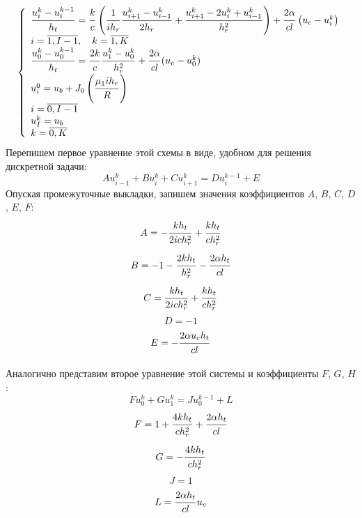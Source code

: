 \documentclass[a4paper,12pt,russian, fleqn]{extreport}
\begin{document}
	\begin{equation}\label{ImplicitScheme}
		\left\{\begin{array}{l}
			\dfrac{\strut u_i^{k}-u_i^{k-1}}{\strut h_t} = \dfrac{\strut k}{\strut c}\left(\dfrac{\strut 1}{\strut ih_r}\dfrac{\strut u_{i+1}^k - u_{i-1}^k}{\strut 2h_r} +\dfrac{\strut u_{i+1}^k - 2u_i^k + u_{i-1}^k}{\strut h^2_r}\right) + \dfrac{\strut 2\alpha}{\strut cl}\left (u_c - u_i^k \right) \\
			i = \overline{1,I-1}, \quad k = \overline{1,K}	 \\
			\dfrac{\strut u_0^{k}-u_0^{k-1}}{\strut h_t} = \dfrac{\strut 2k}{\strut c}\dfrac{\strut u_1^k-u_0^k}{\strut h_r^2} + \dfrac{\strut 2\alpha}{\strut cl}(u_c-u_0^k) \\
			u_i^0 = u_b + J_0\left( \dfrac{\strut \mu_1 ih_r}{\strut R} \right) \\
			i = \overline{0, I-1} \\
			u_I^k = u_b \\
			k = \overline{0,K}
		\end{array}\right.
	\end{equation}
	Перепишем первое уравнение этой схемы в виде, удобном для решения дискретной задачи:
	\begin{equation}\label{TridiagonalEquationOne}
		Au^k_{i-1} + Bu^k_i + Cu^k_{i+1} = Du_i^{k-1} + E
	\end{equation}
	Опуская промежуточные выкладки, запишем значения коэффициентов $A$, $B$, $C$, $D$, $E$, $F$:
	\begin{equation*}
		A = -\dfrac{\strut k h_t}{\strut 2ich_r^2} + \dfrac{\strut k h_t}{\strut c h_r^2}
	\end{equation*}
	\begin{equation*}
		B = - 1 - \dfrac{\strut 2 k h_t}{\strut h_r^2} - \dfrac{\strut 2 \alpha h_t}{\strut cl}
	\end{equation*}
	\begin{equation*}
		C = \dfrac{\strut k h_t}{\strut 2ich_r^2} + \dfrac{\strut k h_t}{\strut c h_r^2}
	\end{equation*}
	\begin{equation*}
		D = -1
	\end{equation*}
	\begin{equation*}
		E = - \dfrac{\strut 2\alpha u_c h_t}{\strut cl}
	\end{equation*}
	
	Аналогично представим второе уравнение этой системы и коэффициенты $F$, $G$, $H$:
	\begin{equation}\label{TridiagonalEquationTwo}
		Fu_0^k + Gu_1^{k} = Ju_0^{k-1} + L
	\end{equation}
	\begin{equation*}
		F = 1 + \dfrac{\strut 4kh_t}{\strut ch_r^2} + \dfrac{\strut 2\alpha h_t}{\strut cl}
	\end{equation*}
	\begin{equation*}
		G = -\dfrac{\strut 4kh_t}{\strut ch_r^2}
	\end{equation*}
	\begin{equation*}
		J = 1
	\end{equation*}
	\begin{equation*}
		L = \dfrac{\strut 2\alpha h_t}{\strut cl}u_c
	\end{equation*}
\end{document}
